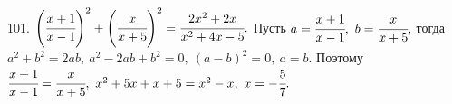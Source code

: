 101. $\left(\cfrac{x+1}{x-1}\right)^2+\left(\cfrac{x}{x+5}\right)^2=\cfrac{2x^2+2x}{x^2+4x-5}.$  Пусть $a=\cfrac{x+1}{x-1},\ b=\cfrac{x}{x+5},$ тогда $a^2+b^2=2ab,\ a^2-2ab+b^2=0,\ (a-b)^2=0,\ a=b.$ Поэтому $\cfrac{x+1}{x-1}=\cfrac{x}{x+5},\ x^2+5x+x+5=x^2-x,\ x=-\cfrac{5}{7}.$\\
